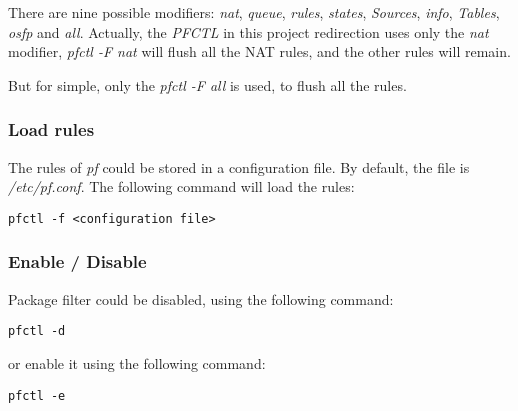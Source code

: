 There are nine possible modifiers: \textit{nat}, \textit{queue}, \textit{rules}, \textit{states}, \textit{Sources}, \textit{info}, \textit{Tables}, \textit{osfp} and \textit{all}. Actually, the \textit{PFCTL} in this project redirection uses only the \textit{nat} modifier, \textit{pfctl -F nat} will flush all the NAT rules, and the other rules will remain.

But for simple, only the \textit{pfctl -F all} is used, to flush all the rules.

\subsubsection{Load rules}

The rules of \textit{pf} could be stored in a configuration file. By default, the file is \textit{/etc/pf.conf}. The following command will load the rules:

\begin{lstlisting}
pfctl -f <configuration file>
\end{lstlisting}

\subsubsection{Enable / Disable}
Package filter could be disabled, using the following command:

\begin{lstlisting}
pfctl -d
\end{lstlisting}

or enable it using the following command:
\begin{lstlisting}
pfctl -e
\end{lstlisting}

